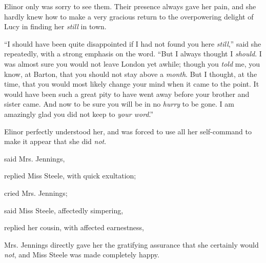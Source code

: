 Elinor only was sorry to see them. Their presence always gave her pain, and she hardly knew how to make a very gracious return to the overpowering delight of Lucy in finding her {\em still} in town.

“I should have been quite disappointed if I had not found you here {\em still},” said she repeatedly, with a strong emphasis on the word. “But I always thought I {\em should}. I was almost sure you would not leave London yet awhile; though you {\em told} me, you know, at Barton, that you should not stay above a {\em month}. But I thought, at the time, that you would most likely change your mind when it came to the point. It would have been such a great pity to have went away before your brother and sister came. And now to be sure you will be in no {\em hurry} to be gone. I am amazingly glad you did not keep to {\em your word}.”

Elinor perfectly understood her, and was forced to use all her self-command to make it appear that she did {\em not}.

 said Mrs. Jennings, 

 replied Miss Steele, with quick exultation; 

 cried Mrs. Jennings; 

 said Miss Steele, affectedly simpering, 


 replied her cousin, with affected earnestness, 

Mrs. Jennings directly gave her the gratifying assurance that she certainly would {\em not}, and Miss Steele was made completely happy.

